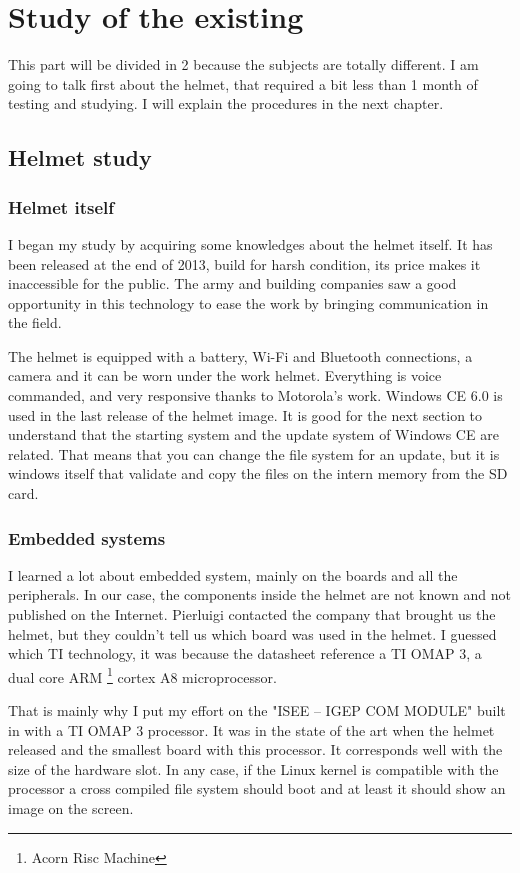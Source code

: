 \chapter[Studies]{Study of the existing}
 \par This part will be divided in 2 because the subjects are totally different. I am going to talk first about the helmet, that required a bit less than 1 month of testing and studying. I will explain the procedures in the next chapter. 
	
	\section{Helmet study}	
	\subsection{Helmet itself}
	\par I began my study by acquiring some knowledges about the helmet itself. It has been released at the end of 2013, build for harsh condition, its price makes it inaccessible for the public. The army and building companies saw a good opportunity in this technology to ease the work by bringing communication in the field.
	\par The helmet is equipped with a battery, Wi-Fi and Bluetooth connections, a camera and it can be worn under the work helmet. Everything is voice commanded, and very responsive thanks to Motorola's work. Windows CE 6.0 is used in the last release of the helmet image. It is good for the next section to understand that the starting system and the update system of Windows CE are related. That means that you can change the file system for an update, but it is windows itself that validate and copy the files on the intern memory from the SD card.
	\subsection{Embedded systems}
	\par I learned a lot about embedded system, mainly on the boards and all the peripherals. In our case, the components inside the helmet are not known and not published on the Internet. Pierluigi contacted the company that brought us the helmet, but they couldn't tell us which board was used in the helmet. I guessed which TI technology, it was because the datasheet reference a TI OMAP 3, a dual core ARM \footnote{Acorn Risc Machine} cortex A8 microprocessor.
	\par That is mainly why I put my effort on the "ISEE – IGEP COM MODULE" built in with a TI OMAP 3 processor. It was in the state of the art when the helmet released and the smallest board with this processor. It corresponds well with the size of the hardware slot. In any case, if the Linux kernel is compatible with the processor a cross compiled file system should boot and at least it should show an image on the screen.
	
